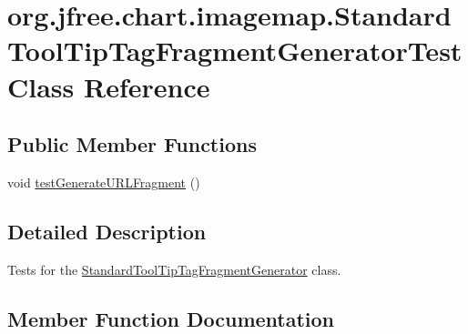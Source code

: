\hypertarget{classorg_1_1jfree_1_1chart_1_1imagemap_1_1_standard_tool_tip_tag_fragment_generator_test}{}\section{org.\+jfree.\+chart.\+imagemap.\+Standard\+Tool\+Tip\+Tag\+Fragment\+Generator\+Test Class Reference}
\label{classorg_1_1jfree_1_1chart_1_1imagemap_1_1_standard_tool_tip_tag_fragment_generator_test}
\subsection*{Public Member Functions}
\begin{DoxyCompactItemize}
\item 
void \mbox{\hyperlink{classorg_1_1jfree_1_1chart_1_1imagemap_1_1_standard_tool_tip_tag_fragment_generator_test_a8bff912926aea38f5536c39db72d5a37}{test\+Generate\+U\+R\+L\+Fragment}} ()
\end{DoxyCompactItemize}


\subsection{Detailed Description}
Tests for the \mbox{\hyperlink{classorg_1_1jfree_1_1chart_1_1imagemap_1_1_standard_tool_tip_tag_fragment_generator}{Standard\+Tool\+Tip\+Tag\+Fragment\+Generator}} class. 

\subsection{Member Function Documentation}
\mbox{\label{classorg_1_1jfree_1_1chart_1_1imagemap_1_1_standard_tool_tip_tag_fragment_generator_test_a8bff912926aea38f5536c39db72d5a37}} 
